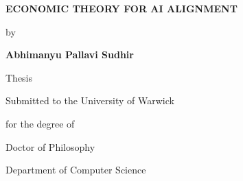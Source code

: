 \begin{titlepage}
\begin{center}
\vspace*{2cm}

{\LARGE\bfseries ECONOMIC THEORY FOR AI ALIGNMENT\par}

\vspace{3cm}

{\Large by\par}
\vspace{0.5cm}
{\Large\bfseries Abhimanyu Pallavi Sudhir\par}

\vspace{3cm}

{\large Thesis\par}
\vspace{0.3cm}
{\large Submitted to the University of Warwick\par}
\vspace{0.3cm}
{\large for the degree of\par}
\vspace{0.3cm}
{\large Doctor of Philosophy\par}

\vspace{2cm}

{\large Department of Computer Science\par}
\vspace{0.5cm}
{\large{}\par}

\end{center}
\end{titlepage}
